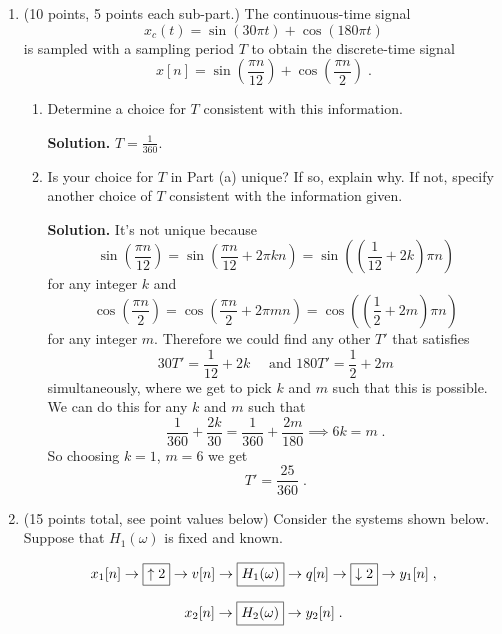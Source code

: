 \documentclass[]{siamltex}
\begin{document}
\newpage
\begin{enumerate}
\item (10 points, 5 points each sub-part.) The continuous-time signal $$x_c(t) = \sin(30 \pi t ) + \cos (180 \pi t)$$ is sampled with a sampling period $T$ to obtain the discrete-time signal $$x[n] = \sin\left(\frac{\pi n}{12}\right) + \cos\left(\frac{\pi n}{2}\right)\;.$$ 

\vspace{5mm} 
\begin{enumerate}
\item Determine a choice for $T$ consistent with this information. 

\vspace{1cm} 
\textbf{Solution.} $T = \frac{1}{360}$.

\vspace{1cm}
\item Is your choice for $T$ in Part (a) unique? If so, explain why. If not, specify another choice of $T$ consistent with the information given.

\vspace{1cm} 
\textbf{Solution.} It's not unique because $$\sin\left(\frac{\pi n}{12}\right) = \sin \left(\frac{\pi n}{12} + 2\pi k n\right) = \sin \left( \left(\frac{1}{12} + 2 k\right) \pi n\right)  $$ for any integer $k$ and 
$$\cos\left(\frac{\pi n}{2}\right) = \cos\left(\frac{\pi n}{2} + 2\pi m n\right) = \cos\left( \left( \frac{1}{2} + 2m\right) \pi n \right)$$ for any integer $m$. Therefore we could find any other $T'$ that satisfies $$30 T' = \frac{1}{12} + 2k \quad \text{ and } 180 T' = \frac{1}{2} + 2m$$ simultaneously, where we get to pick $k$ and $m$ such that this is possible. We can do this for any $k$ and $m$ such that $$\frac{1}{360} + \frac{2k}{30} = \frac{1}{360}+\frac{2m}{180} \implies 6k=m\;.$$ So choosing $k=1$, $m=6$ we get $$T' = \frac{25}{360}\;.$$

\end{enumerate}


\newpage
\item (15 points total, see point values below) Consider the systems shown below. Suppose that $H_1(\omega)$ is fixed and known. 

$$x_1[n] \rightarrow \fbox{$\uparrow 2$} \rightarrow v[n]  \rightarrow \fbox{$H_1(\omega)$}  \rightarrow q[n]\rightarrow \fbox{$\downarrow 2$} \rightarrow y_1[n]\;,$$

$$x_2[n] \rightarrow \fbox{$H_2(\omega)$} \rightarrow y_2[n]\;.$$


\end{enumerate}
\end{document}
